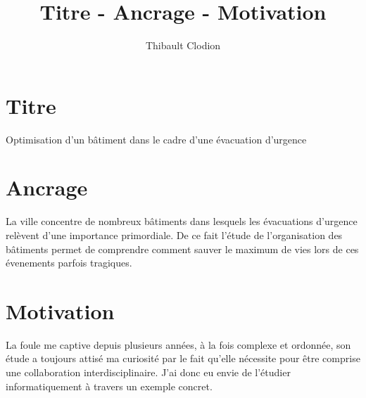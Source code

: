\documentclass{article}
\title{Titre - Ancrage - Motivation}
\author{Thibault Clodion}
\begin{document}
\maketitle %

\section{Titre}
Optimisation d'un bâtiment dans le cadre d'une évacuation d'urgence

\section{Ancrage}
La ville concentre de nombreux bâtiments dans lesquels les évacuations d'urgence relèvent d'une importance primordiale. De ce fait 
l'étude de l'organisation des bâtiments permet de comprendre comment sauver le maximum de vies lors de ces évenements parfois tragiques.

\section{Motivation}
La foule me captive depuis plusieurs années, à la fois complexe et ordonnée, son étude a toujours attisé ma curiosité par le fait qu'elle nécessite pour être
comprise une collaboration interdisciplinaire. J'ai donc eu envie de l'étudier informatiquement à travers un exemple concret.
\end{document}
